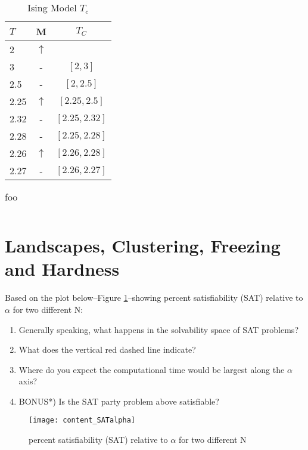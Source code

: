 \documentclass[]{article}
\begin{document}
\begin{table}[H]
	\begin{center}
		\caption{Ising Model $T_c$}\label{eq:ising}
		\begin{tabular}{|l|c|c|}\hline
			$T$&M&$T_C$\\ \hline
			2&$\uparrow$&\\ \hline
			3&-&$[2,3]$\\ \hline
			2.5&-&$[2,2.5]$\\ \hline
			2.25&$\uparrow$&$[2.25,2.5]$\\ \hline
			2.32&-&$[2.25,2.32]$\\ \hline
			2.28&-&$[2.25,2.28]$\\ \hline
			2.26&$\uparrow$&$[2.26,2.28]$\\ \hline
			2.27&-&$[2.26,2.27]$\\ \hline
		\end{tabular}
	\end{center}
\end{table}

\begin{table}[H]
	\begin{center}
		\caption{foo}\label{eq:foo}
		\begin{tabular}{|c|c|}\hline
			&\\ \hline
		\end{tabular}
	\end{center}
\end{table}

\section{Landscapes, Clustering, Freezing and Hardness}

Based on the plot below--Figure \ref{fig:content_SATalpha}--showing percent satisfiability (SAT) relative to $\alpha$ for two different N:

\begin{enumerate}
	\item  Generally speaking, what happens in the solvability space of SAT problems?

	\item  What does the vertical red dashed line indicate?

	\item   Where do you expect the computational time would be largest along the $\alpha$ axis?

	\item   BONUS*) Is the SAT party problem above satisfiable?
\end{enumerate}


\begin{figure}[H]
	\begin{center}
		\caption{percent satisfiability (SAT) relative to $\alpha$ for two different N}\label{fig:content_SATalpha}
		\texttt{[image: content\_SATalpha]}
	\end{center}
\end{figure}


\raggedright
{}

\end{document}
